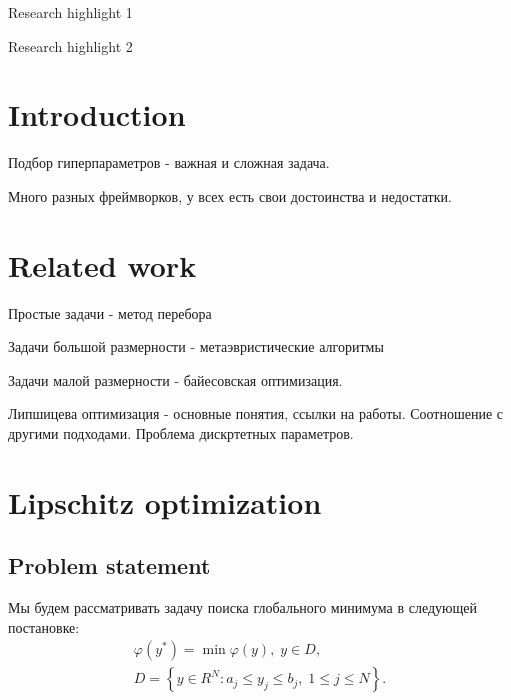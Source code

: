 \documentclass[preprint,12pt]{elsarticle}
\begin{document}
\begin{frontmatter}
\begin{highlights}
\item Research highlight 1
\item Research highlight 2
\end{highlights}

\begin{keyword}



\end{keyword}

\end{frontmatter}

\linenumbers

\section{Introduction}
\label{sec_intro}
Подбор гиперпараметров - важная и сложная задача.

Много разных фреймворков, у всех есть свои достоинства и недостатки.


\section{Related work}
\label{sec_rel}

Простые задачи - метод перебора

Задачи большой размерности - метаэвристические алгоритмы

Задачи малой размерности - байесовская оптимизация.

Липшицева оптимизация - основные понятия, ссылки на работы. Соотношение с другими подходами. Проблема дискртетных параметров. 



\section{Lipschitz optimization} 
\label{sec_lip}

\subsection{Problem statement} 

Мы будем рассматривать задачу поиска глобального минимума в следующей постановке:
\begin{gather}
	\varphi(y^*) = \min \varphi(y), \; y \in D, \label{f_func} \\
	D = \left\{y \in R^N : a_j \leq y_j \leq b_j , \; 1 \leq j \leq N \right\}. \label{f_D}
\end{gather}
\end{document}
